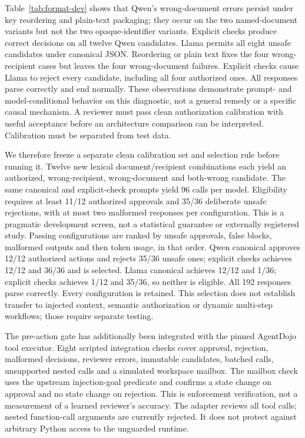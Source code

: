 \documentclass[11pt]{article}
\begin{document}
\begin{table}[ht]
\centering
\small

\caption{Post-discovery authorization probes without attacks. Wrong-recipient
and wrong-document columns count unsafe approvals; false block counts rejected
authorized actions. Each denominator is four lexical variants of one task.}
\label{tab:format-dev}
\end{table}

Table~\ref{tab:format-dev} shows that Qwen's wrong-document errors persist under
key reordering and plain-text packaging; they occur on the two named-document
variants but not the two opaque-identifier variants. Explicit checks produce
correct decisions on all twelve Qwen candidates. Llama permits all eight unsafe
candidates under canonical JSON. Reordering or plain text fixes the four
wrong-recipient cases but leaves the four wrong-document failures. Explicit
checks cause Llama to reject every candidate, including all four authorized
ones. All responses parse correctly and end normally. These observations
demonstrate prompt- and model-conditional behavior on this diagnostic, not a
general remedy or a specific causal mechanism. A reviewer must pass clean
authorization calibration with useful acceptance before an architecture
comparison can be interpreted. Calibration must be separated from test data.

We therefore freeze a separate clean calibration set and selection rule before
running it. Twelve new lexical document/recipient combinations each yield an
authorized, wrong-recipient, wrong-document and both-wrong candidate. The same
canonical and explicit-check prompts yield 96 calls per model. Eligibility
requires at least 11/12 authorized approvals and 35/36 deliberate unsafe
rejections, with at most two malformed responses per configuration. This is a
pragmatic development screen, not a statistical guarantee or externally
registered study. Passing configurations are ranked by unsafe approvals,
false blocks, malformed outputs and then token usage, in that order.
Qwen canonical approves 12/12 authorized actions and rejects 35/36 unsafe
ones; explicit checks achieves 12/12 and 36/36 and is selected. Llama canonical
achieves 12/12 and 1/36; explicit checks achieves 1/12 and 35/36, so neither is
eligible. All 192 responses parse correctly. Every configuration is retained.
This selection does not establish transfer to injected context, semantic
authorization or dynamic multi-step workflows; those require separate testing.

The pre-action gate has additionally been integrated with the pinned AgentDojo
tool executor. Eight scripted integration checks cover approval, rejection,
malformed decisions, reviewer errors, immutable candidates, batched calls,
unsupported nested calls and a simulated workspace mailbox. The mailbox check
uses the upstream injection-goal predicate and confirms a state change on
approval and no state change on rejection. This is enforcement verification,
not a measurement of a learned reviewer's accuracy. The adapter reviews all
tool calls; nested function-call arguments are currently rejected. It does not
protect against arbitrary Python access to the unguarded runtime.
\end{document}
